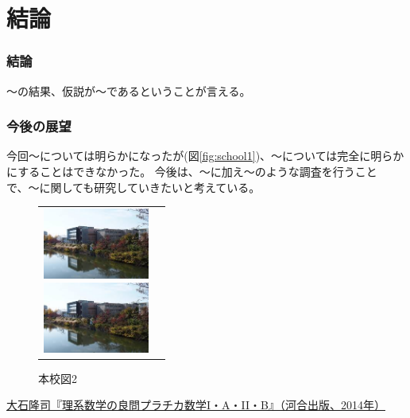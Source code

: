 \documentclass[twocolumn]{jsarticle}
\begin{document}
\part{結論}
\section{結論}
〜の結果、仮説が〜であるということが言える。
\section{今後の展望}
今回〜については明らかになったが(図\ref{fig:school1})、〜については完全に明らかにすることはできなかった。
今後は、〜に加え〜のような調査を行うことで、〜に関しても研究していきたいと考えている。

\begin{figure}[h]
  \begin{tabular}{cc}
     \begin{minipage}[t]{0.5\hsize}
       \begin{center}
         \includegraphics[clip,width=35mm,angle=0]{images/honko.jpg}
         \caption{本校図1}
         \label{fig:school1}
       \end{center}
     \end{minipage}
     \begin{minipage}[t]{0.5\hsize}
       \begin{center}
         \includegraphics[clip,width=35mm,angle=0]{images/honko.jpg}
         \caption{本校図2}
         \label{fig:school2}
       \end{center}
     \end{minipage}
  \end{tabular}
\end{figure}


\begin{thebibliography}{10}
  \url{大石隆司『理系数学の良問プラチカ数学I・A・II・B』（河合出版、2014年）}

\end{thebibliography}
\end{document}

